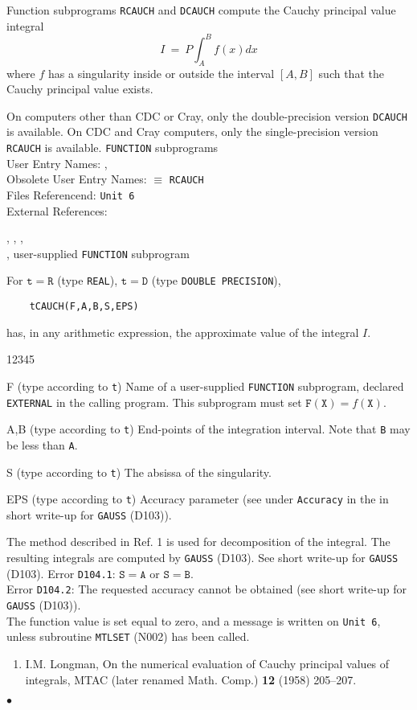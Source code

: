                
           
\Submitter{}                     
               
Function subprograms {\tt RCAUCH} and {\tt DCAUCH}
compute the Cauchy principal value integral
$$ I \ = \ P \int_A^B f(x)dx $$
where $f$ has a singularity inside or outside the interval
$[A,B]$ such that the Cauchy principal value exists.
\par
On computers other than CDC or Cray, only
the double-precision version {\tt DCAUCH} is available.
On CDC and  Cray computers, only the single-precision version
{\tt RCAUCH} is available.
\Structure
{\tt FUNCTION} subprograms \\
User Entry Names: , \\
Obsolete User Entry Names:  $\equiv$ {\tt RCAUCH} \\
Files Referencend: {\tt Unit 6} \\
External References: \parbox[t]{100mm}{
, ,
, \\
, user-supplied {\tt  FUNCTION} subprogram}
\Usage
For $\mathtt{t=R}$ (type {\tt REAL}), $\mathtt{t=D}$ (type
{\tt DOUBLE PRECISION}),
\begin{verbatim}
    tCAUCH(F,A,B,S,EPS)
\end{verbatim}
has, in any arithmetic expression, the approximate value of the
integral $I$.
\begin{DLtt}{12345}
\item [F] (type according to {\tt t})
Name of a user-supplied {\tt FUNCTION} subprogram, declared
{\tt EXTERNAL} in the calling program. This subprogram must set
$\mathtt{F(X)} = f(\mathtt{X})$.
\item [A,B] (type according to {\tt t}) End-points of the integration
interval. Note that {\tt B} may be less than {\tt A}.
\item [S] (type according to {\tt t}) The absissa of the singularity.
\item [EPS]
(type according to {\tt t}) Accuracy parameter (see under
{\tt Accuracy} in the in short write-up for {\tt GAUSS} (D103)).
\end{DLtt}
\Method
The method described in  Ref. 1 is used for
decomposition of the integral. The resulting integrals are
computed by {\tt GAUSS} (D103).
\Accuracy
See short write-up for {\tt GAUSS} (D103).
\Errorh
Error {\tt D104.1}: $\mathtt{S=A}$ or $\mathtt{S=B}$. \\
Error {\tt D104.2}: The requested accuracy cannot be obtained
(see short write-up for {\tt GAUSS} (D103)). \\
The function value is set equal to zero, and a message is written on
{\tt Unit 6}, unless subroutine {\tt MTLSET} (N002) has been called.
\Refer
\begin{enumerate}
\item I.M. Longman, On the numerical evaluation of Cauchy principal
values of integrals, MTAC (later renamed Math. Comp.)
{\bf 12} (1958) 205--207.
\end{enumerate}
$\bullet$
